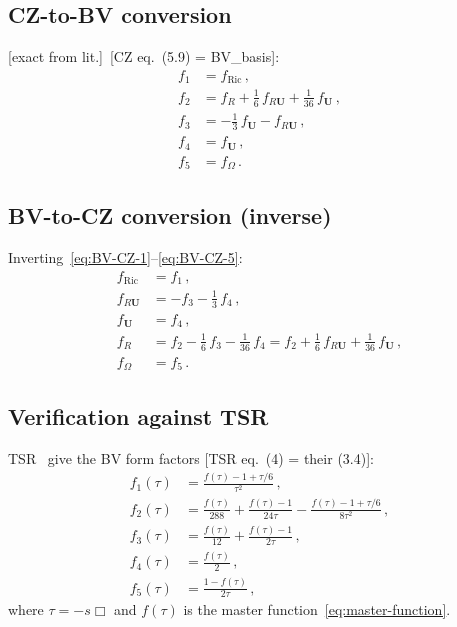 \documentclass[12pt,a4paper]{article}
\theoremstyle{definition}
\theoremstyle{remark}
\newcommand{\fromlit}[1]{\textcolor{blue!70!black}{\textsf{[#1]}}}
\newcommand{\exactlit}{\textcolor{blue!60!black}{\textsf{[exact from lit.]}}}
\begin{document}
\subsection{CZ-to-BV conversion}

\exactlit\ \fromlit{CZ eq.~(5.9) = BV\_basis}:
\begin{align}
  f_1 &= f_{\mathrm{Ric}}\,, \label{eq:BV-CZ-1}\\
  f_2 &= f_R + \frac{1}{6}\,f_{R\mathbf{U}}
    + \frac{1}{36}\,f_{\mathbf{U}}\,, \label{eq:BV-CZ-2}\\
  f_3 &= -\frac{1}{3}\,f_{\mathbf{U}}
    - f_{R\mathbf{U}}\,, \label{eq:BV-CZ-3}\\
  f_4 &= f_{\mathbf{U}}\,, \label{eq:BV-CZ-4}\\
  f_5 &= f_\Omega\,. \label{eq:BV-CZ-5}
\end{align}

\subsection{BV-to-CZ conversion (inverse)}

Inverting~\eqref{eq:BV-CZ-1}--\eqref{eq:BV-CZ-5}:
\begin{align}
  f_{\mathrm{Ric}} &= f_1\,, \\
  f_{R\mathbf{U}} &= -f_3 - \frac{1}{3}\,f_4\,, \\
  f_{\mathbf{U}} &= f_4\,, \\
  f_R &= f_2 - \frac{1}{6}\,f_3 - \frac{1}{36}\,f_4
    = f_2 + \frac{1}{6}\,f_{R\mathbf{U}} + \frac{1}{36}\,f_{\mathbf{U}}\,, \\
  f_\Omega &= f_5\,.
\end{align}

\subsection{Verification against TSR}
\label{sec:BV-CZ-verify}

TSR~\cite{TSR2020} give the BV form factors
\fromlit{TSR eq.~(4) = their (3.4)}:
\begin{align}
  f_1(\tau) &= \frac{f(\tau) - 1 + \tau/6}{\tau^2}\,,
    \label{eq:TSR-f1}\\
  f_2(\tau) &= \frac{f(\tau)}{288}
    + \frac{f(\tau)-1}{24\tau}
    - \frac{f(\tau)-1+\tau/6}{8\tau^2}\,,
    \label{eq:TSR-f2}\\
  f_3(\tau) &= \frac{f(\tau)}{12}
    + \frac{f(\tau)-1}{2\tau}\,,
    \label{eq:TSR-f3}\\
  f_4(\tau) &= \frac{f(\tau)}{2}\,,
    \label{eq:TSR-f4}\\
  f_5(\tau) &= \frac{1-f(\tau)}{2\tau}\,,
    \label{eq:TSR-f5}
\end{align}
where $\tau = -s\Box$ and $f(\tau)$ is the master
function~\eqref{eq:master-function}.
\end{document}

